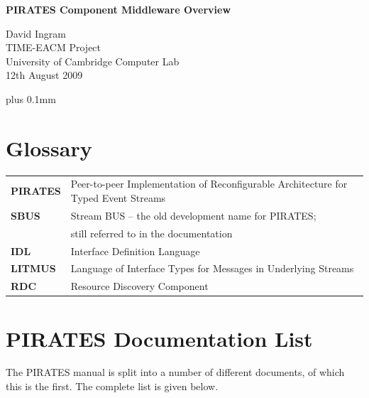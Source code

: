 \documentclass[12pt,a4paper,twoside]{article}
\renewcommand{\_}{\texttt{\symbol{95}}}
\begin{document}
\centerline{\textbf{\LARGE PIRATES Component Middleware Overview}}
\begin{center} \large
David Ingram\\
TIME-EACM Project\\
University of Cambridge Computer Lab\\
12th August 2009\\
\end{center}

{ \parskip 0.1mm plus 0.1mm \tableofcontents }
\pagestyle{fancy}
\newpage

\section*{Glossary}

\begin{tabular}{l@{\ --\ }l}
\textbf{PIRATES} & Peer-to-peer Implementation of Reconfigurable
	Architecture for Typed Event Streams\\
\textbf{SBUS} & Stream BUS -- the old development name for PIRATES;\\
	& still referred to in the documentation\\
\textbf{IDL} & Interface Definition Language\\
\textbf{LITMUS} & Language of Interface Types for Messages in Underlying Streams\\
\textbf{RDC} & Resource Discovery Component\\
\end{tabular}

\section*{PIRATES Documentation List}

The PIRATES manual is split into a number of different documents, of which this
is the first. The complete list is given below.
\end{document}
